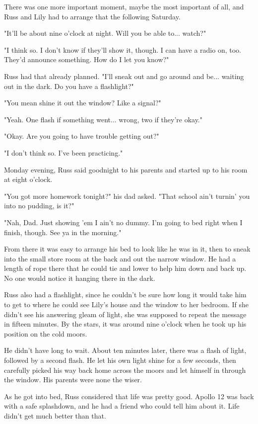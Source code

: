 \documentclass[a4paper,11pt]{article}
\begin{document}
There was one more important moment, maybe the most important of all, and Russ and Lily had to arrange that the following Saturday.

"It'll be about nine o'clock at night. Will you be able to... watch?"

"I think so. I don't know if they'll show it, though. I can have a radio on, too. They'd announce something. How do I let you know?"

Russ had that already planned. "I'll sneak out and go around and be... waiting out in the dark. Do you have a flashlight?"

"You mean shine it out the window? Like a signal?"

"Yeah. One flash if something went... wrong, two if they're okay."

"Okay. Are you going to have trouble getting out?"

"I don't think so. I've been practicing."

Monday evening, Russ said goodnight to his parents and started up to his room at eight o'clock.

"You got more homework tonight?" his dad asked. "That school ain't turnin' you into no pudding, is it?"

"Nah, Dad. Just showing 'em I ain't no dummy. I'm going to bed right when I finish, though. See ya in the morning."

From there it was easy to arrange his bed to look like he was in it, then to sneak into the small store room at the back and out the narrow window. He had a length of rope there that he could tie and lower to help him down and back up. No one would notice it hanging there in the dark.

Russ also had a flashlight, since he couldn't be sure how long it would take him to get to where he could see Lily's house and the window to her bedroom. If she didn't see his answering gleam of light, she was supposed to repeat the message in fifteen minutes. By the stars, it was around nine o'clock when he took up his position on the cold moors.

He didn't have long to wait. About ten minutes later, there was a flash of light, followed by a second flash. He let his own light shine for a few seconds, then carefully picked his way back home across the moors and let himself in through the window. His parents were none the wiser.

As he got into bed, Russ considered that life was pretty good. Apollo 12 was back with a safe splashdown, and he had a friend who could tell him about it. Life didn't get much better than that.
\end{document}
